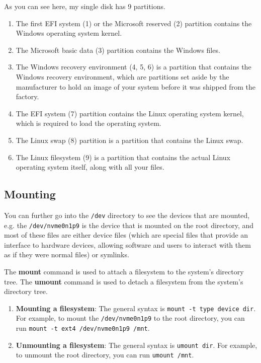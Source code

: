 \documentclass{article}
\begin{document}
  As you can see here, my single disk has 9 partitions. 
  \begin{enumerate} 
    \item The first EFI system (1) or the Microsoft reserved (2) partition contains the Windows operating system kernel. 
    \item The Microsoft basic data (3) partition contains the Windows files.
    \item  The Windows recovery environment (4, 5, 6) is a partition that contains the Windows recovery environment, which are partitions set aside by the manufacturer to hold an image of your system before it was shipped from the factory. 
    \item The EFI system (7) partition contains the Linux operating system kernel, which is required to load the operating system. 
    \item The Linux swap (8) partition is a partition that contains the Linux swap. 
    \item The Linux filesystem (9) is a partition that contains the actual Linux operating system itself, along with all your files.
  \end{enumerate}


  \subsection{Mounting} 

    You can further go into the \texttt{/dev} directory to see the devices that are mounted, e.g. the \texttt{/dev/nvme0n1p9} is the device that is mounted on the root directory, and most of these files are either device files (which are special files that provide an interface to hardware devices, allowing software and users to interact with them as if they were normal files) or symlinks.

    The \textbf{mount} command is used to attach a filesystem to the system's directory tree. The \textbf{umount} command is used to detach a filesystem from the system's directory tree. 

    \begin{enumerate}
      \item \textbf{Mounting a filesystem}: The general syntax is \texttt{mount -t type device dir}. For example, to mount the \texttt{/dev/nvme0n1p9} to the root directory, you can run \texttt{mount -t ext4 /dev/nvme0n1p9 /mnt}. 
      \item \textbf{Unmounting a filesystem}: The general syntax is \texttt{umount dir}. For example, to unmount the root directory, you can run \texttt{umount /mnt}. 
    \end{enumerate}
\end{document}
